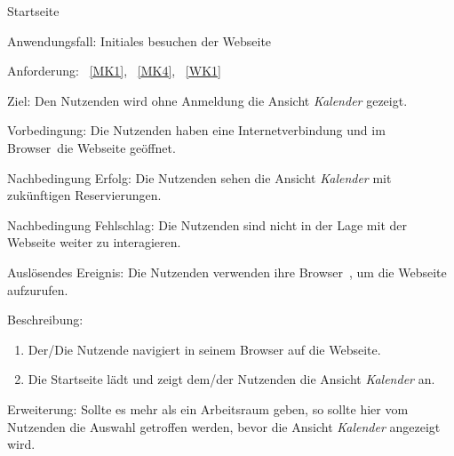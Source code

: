 \begin{function}{10}{Startseite}
    \item[Anwendungsfall:] Initiales besuchen der Webseite
    \item[Anforderung:]~\ref{MK1}, ~\ref{MK4}, ~\ref{WK1}
    \item[Ziel:] Den Nutzenden wird ohne Anmeldung die Ansicht \textit{Kalender} gezeigt.
    \item[Vorbedingung:] Die Nutzenden haben eine Internetverbindung und im \gls{Browser}~die Webseite geöffnet.
    \item[Nachbedingung Erfolg:] Die Nutzenden sehen die Ansicht \textit{Kalender} mit zukünftigen Reservierungen.
    \item[Nachbedingung Fehlschlag:] Die Nutzenden sind nicht in der Lage mit der Webseite weiter zu interagieren.
    \item[Auslösendes Ereignis:] Die Nutzenden verwenden ihre \gls{Browser}~, um die Webseite aufzurufen.
    \item[Beschreibung:]~
    \begin{enumerate}
        \item Der/Die Nutzende navigiert in seinem Browser auf die Webseite.
        \item Die Startseite lädt und zeigt dem/der Nutzenden die Ansicht \textit{Kalender} an.
    \end{enumerate}
    \item[Erweiterung:] Sollte es mehr als ein Arbeitsraum geben, so sollte hier vom Nutzenden die Auswahl getroffen werden, bevor die Ansicht \textit{Kalender} angezeigt wird.
\end{function}

\pagebreak

